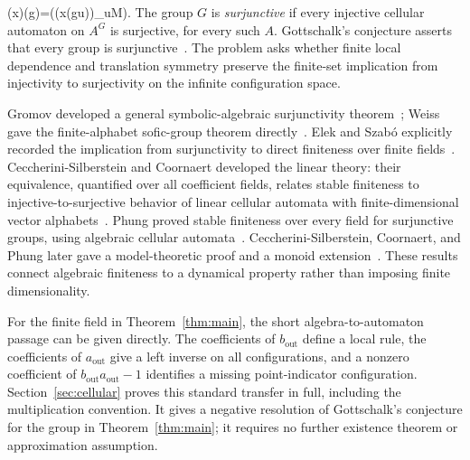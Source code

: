   \tau(x)(g)=\phi\bigl((x(gu))_{u\in M}\bigr).
\]
The group $G$ is \emph{surjunctive} if every injective cellular automaton on $A^G$ is surjective, for every such $A$. Gottschalk's conjecture asserts that every group is surjunctive~\cite{Gottschalk1973}. The problem asks whether finite local dependence and translation symmetry preserve the finite-set implication from injectivity to surjectivity on the infinite configuration space.

Gromov developed a general symbolic-algebraic surjunctivity theorem~\cite[Section~7.G$'$]{Gromov1999}; Weiss gave the finite-alphabet sofic-group theorem directly~\cite[Theorem~3.2]{Weiss2000}. Elek and Szab\'o explicitly recorded the implication from surjunctivity to direct finiteness over finite fields~\cite[Section~1]{ElekSzabo2004}. Ceccherini-Silberstein and Coornaert developed the linear theory: their equivalence, quantified over all coefficient fields, relates stable finiteness to injective-to-surjective behavior of linear cellular automata with finite-dimensional vector alphabets~\cite[Theorem~4.2]{CSCCoornaert2006}. Phung proved stable finiteness over every field for surjunctive groups, using algebraic cellular automata~\cite[Theorem~B]{Phung2023}. Ceccherini-Silberstein, Coornaert, and Phung later gave a model-theoretic proof and a monoid extension~\cite[Theorem~1.1]{CSCPhungGroup2025,CSCPhungMonoid2025}. These results connect algebraic finiteness to a dynamical property rather than imposing finite dimensionality.

For the finite field in Theorem~\ref{thm:main}, the short algebra-to-automaton passage can be given directly. The coefficients of $b_{\mathrm{out}}$ define a local rule, the coefficients of $a_{\mathrm{out}}$ give a left inverse on all configurations, and a nonzero coefficient of $b_{\mathrm{out}}a_{\mathrm{out}}-1$ identifies a missing point-indicator configuration. Section~\ref{sec:cellular} proves this standard transfer in full, including the multiplication convention. It gives a negative resolution of Gottschalk's conjecture for the group in Theorem~\ref{thm:main}; it requires no further existence theorem or approximation assumption.

